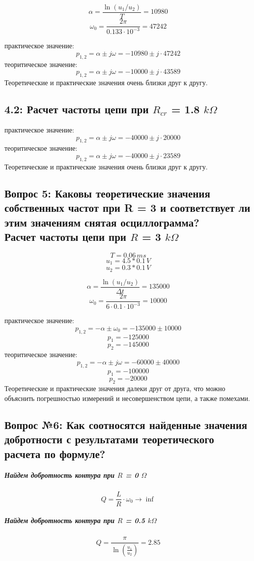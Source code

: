 \documentclass[a4paper,12pt]{report}
\begin{document}
\begin{flushleft}
  \[ \alpha = \frac{\ln(u_1/u_2)}{T} = 10980 \]
  \[ \omega_0 = \frac{2 \pi}{0.133\cdot 10^{-3}} = 47242 \]

  практическое значение:
  \[ p_{1,2} = \alpha \pm j\omega = -10980 \pm j\cdot47242\]
  теоритическое значение:
  \[ p_{1,2} = \alpha \pm j\omega = -10000 \pm j\cdot43589\]
  Теоретические и практические значения очень близки друг к другу.

  \subsection*{4.2: Расчет частоты цепи при $R_{cr}$ = 1.8 $k\Omega$}
  
  практическое значение:
  \[ p_{1,2} = \alpha \pm j\omega = -40000 \pm j\cdot 20000\]
  теоритическое значение:
  \[ p_{1,2} = \alpha \pm j\omega = -40000 \pm j\cdot 23589\]
  Теоретические и практические значения очень близки друг к другу.

  \subsection*{Вопрос 5: Каковы теоретические значения собственных частот при R = 3 и соответствует ли этим значениям снятая осциллограмма? \\
   Расчет частоты цепи при $R$ = 3 $k\Omega$}
  \[ T =  0.06 \, ms \]
  \[ u_1 = 4.5 * 0.1 \, V \]
  \[ u_2 = 0.3 * 0.1 \, V \]

  \[ \alpha = \frac{\ln(u_1/u_2)}{\Delta t} = 135000\]
  \[ \omega_0 = \frac{2 \pi}{6\cdot 0.1\cdot 10^{-3}} = 10000 \]

  практическое значение:
  \[ p_{1,2} = -\alpha \pm \omega_0 = -135000 \pm 10000 \]
  \[p_1 = -125000\]
  \[ p_2 = -145000\]
  теоритическое значение:
  \[ p_{1,2} = -\alpha \pm j\omega = -60000 \pm 40000\]
  \[ p_1 = -100000 \]
  \[ p_2 = -20000 \]
  Теоретические и практические значения далеки друг от друга, что можно объяснить погрешностью измерений и несовершенством цепи, а также помехами.

  \subsection*{Вопрос №6:  Как соотносятся найденные значения добротности с результатами теоретического расчета по формуле? }
  \subparagraph*{Найдем добротность контура при $R$ = 0 $\Omega$}
\[ Q = \frac{L}{R} \cdot \omega_0 \longrightarrow \inf \]

\subparagraph*{Найдем добротность контура при $R$ = 0.5 $k\Omega$}
\[ Q = \frac{\pi}{\ln(\frac{u_1}{u_2})} = 2.85 \]


\end{flushleft}
\end{document}
